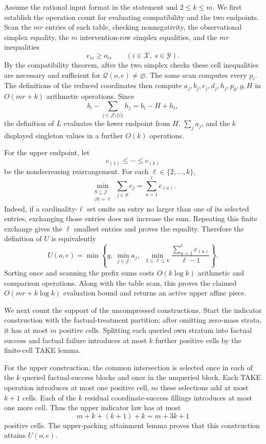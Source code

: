 Assume the rational input format in the statement and \(2\leq k\leq m\).  We first establish the operation count for evaluating compatibility and the two endpoints.  Scan the \(mr\) entries of each table, checking nonnegativity, the observational simplex equality, the \(m\) intervention-row simplex equalities, and the \(mr\) inequalities
\[
e_{is}\geq o_{is}
\qquad(i\in\mathcal X,\ s\in\mathcal Y).
\]
By the compatibility theorem, after the two simplex checks these cell inequalities are necessary and sufficient for \(\mathcal Q(o,e)\neq\varnothing\).  The same scan computes every \(p_i\).  The definitions of the reduced coordinates then compute \(a_j,b_j,c_j,d_j,h_j,p_0,g,H\) in \(O(mr+k)\) arithmetic operations.  Since
\[
b_i-\sum_{j\in\mathcal J\setminus\{i\}}h_j=b_i-H+h_i,
\]
the definition of \(L\) evaluates the lower endpoint from \(H\), \(\sum_j a_j\), and the \(k\) displayed singleton values in a further \(O(k)\) operations.

For the upper endpoint, let
\[
c_{(1)}\leq\cdots\leq c_{(k)}
\]
be the nondecreasing rearrangement.  For each \(\ell\in\{2,\ldots,k\}\),
\[
\min_{\substack{S\subseteq\mathcal J\\ |S|=\ell}}
\sum_{j\in S}c_j
=\sum_{u=1}^{\ell}c_{(u)}.
\]
Indeed, if a cardinality-\(\ell\) set omits an entry no larger than one of its selected entries, exchanging those entries does not increase the sum.  Repeating this finite exchange gives the \(\ell\) smallest entries and proves the equality.  Therefore the definition of \(U\) is equivalently
\[
U(o,e)=\min\left\{g,\ \min_{j\in\mathcal J}a_j,\
\ \min_{2\leq\ell\leq k}
\frac{\sum_{u=1}^{\ell}c_{(u)}}{\ell-1}\right\}.
\]
Sorting once and scanning the prefix sums costs \(O(k\log k)\) arithmetic and comparison operations.  Along with the table scan, this proves the claimed \(O(mr+k\log k)\) evaluation bound and returns an active upper affine piece.

We next count the support of the uncompressed constructions.  Start the indicator construction with the factual-treatment partition; after omitting zero-mass strata, it has at most \(m\) positive cells.  Splitting each queried own stratum into factual success and factual failure introduces at most \(k\) further positive cells by the finite-cell TAKE lemma.

For the upper construction, the common intersection is selected once in each of the \(k\) queried factual-success blocks and once in the unqueried block.  Each TAKE operation introduces at most one positive cell, so these selections add at most \(k+1\) cells.  Each of the \(k\) residual coordinate-success fillings introduces at most one more cell.  Thus the upper indicator law has at most
\[
m+k+(k+1)+k=m+3k+1
\]
positive cells.  The upper-packing attainment lemma proves that this construction attains \(U(o,e)\).

